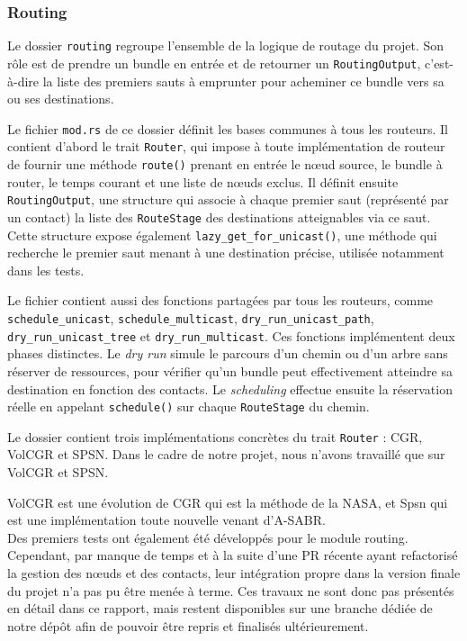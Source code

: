 \documentclass{article}
\begin{document}
\subsubsection[Module : Routing]{Routing}

Le dossier \texttt{routing} regroupe l'ensemble de la logique de routage du projet. Son rôle est de prendre un bundle en entrée et de retourner un \texttt{RoutingOutput}, c'est-à-dire la liste des premiers sauts à emprunter pour acheminer ce bundle vers sa ou ses destinations.

Le fichier \texttt{mod.rs} de ce dossier définit les bases communes à tous les routeurs. Il contient d'abord le trait \texttt{Router}, qui impose à toute implémentation de routeur de fournir une méthode \texttt{route()} prenant en entrée le nœud source, le bundle à router, le temps courant et une liste de nœuds exclus. Il définit ensuite \texttt{RoutingOutput}, une structure qui associe à chaque premier saut (représenté par un contact) la liste des \texttt{RouteStage} des destinations atteignables via ce saut. Cette structure expose également \texttt{lazy\_get\_for\_unicast()}, une méthode qui recherche le premier saut menant à une destination précise, utilisée notamment dans les tests.

Le fichier contient aussi des fonctions partagées par tous les routeurs, comme \texttt{schedule\_unicast}, \texttt{schedule\_multicast}, \texttt{dry\_run\_unicast\_path}, \texttt{dry\_run\_unicast\_tree} et \texttt{dry\_run\_multicast}. Ces fonctions implémentent deux phases distinctes. Le \textit{dry run} simule le parcours d'un chemin ou d'un arbre sans réserver de ressources, pour vérifier qu'un bundle peut effectivement atteindre sa destination en fonction des contacts. Le \textit{scheduling} effectue ensuite la réservation réelle en appelant \texttt{schedule()} sur chaque \texttt{RouteStage} du chemin.

Le dossier contient trois implémentations concrètes du trait \texttt{Router} : CGR, VolCGR et SPSN. Dans le cadre de notre projet, nous n'avons travaillé que sur VolCGR et SPSN. 

VolCGR est une évolution de CGR qui est la méthode de la NASA, et Spsn qui est une implémentation toute nouvelle venant d'A-SABR.\\

Des premiers tests ont également été développés pour le module routing. 
Cependant, par manque de temps et à la suite d’une PR récente ayant refactorisé la gestion des nœuds et des contacts,
leur intégration propre dans la version finale du projet n’a pas pu être menée à terme. 
Ces travaux ne sont donc pas présentés en détail dans ce rapport, mais restent disponibles sur une branche
dédiée de notre dépôt afin de pouvoir être repris et finalisés ultérieurement.
\end{document}
